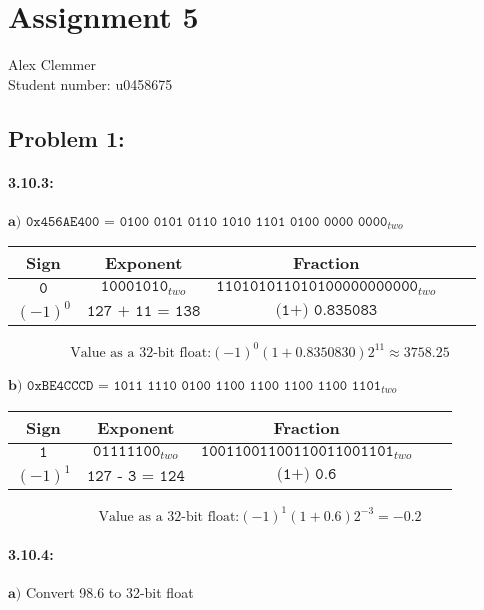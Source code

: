 \documentclass[a4paper]{article}
\begin{document}
\section*{Assignment 5 }
Alex Clemmer\\
Student number: u0458675

\subsection*{Problem 1:}
\paragraph*{3.10.3:} $\textbf{a)}$ $\texttt{0x456AE400 = 0100 0101 0110 1010 1101 0100 0000 0000}_{two}$

\begin{center}
\begin{tabular}{|c|c|c|c|c|}
\hline
Sign & Exponent & Fraction\\
\hline
$\texttt{0}$ & $\texttt{10001010}_{two}$ & $\texttt{110101011010100000000000}_{two}$ \\
\hline
$(-1)^0$ & $\texttt{127 + 11 = 138}$ & $\texttt{(1+) 0.835083}$ \\
\hline
\end{tabular}
\end{center}

\begin{equation}
\mbox{Value as a 32-bit float:} (-1)^0(1+ 0.8350830)2^11 \approx 3758.25
\end{equation}

$\textbf{b)}$ $\texttt{0xBE4CCCD = 1011 1110 0100 1100 1100 1100 1100 1101}_{two}$

\begin{center}
\begin{tabular}{|c|c|c|c|c|}
\hline
Sign & Exponent & Fraction\\
\hline
$\texttt{1}$ & $\texttt{01111100}_{two}$ & $\texttt{10011001100110011001101}_{two}$ \\
\hline
$(-1)^1$ & $\texttt{127 - 3 = 124}$ & $\texttt{(1+) 0.6}$ \\
\hline
\end{tabular}
\end{center}

\begin{equation}
\mbox{Value as a 32-bit float:} (-1)^1(1+ 0.6)2^{-3} = -0.2
\end{equation}

\paragraph*{3.10.4:} $\textbf{a)}$ Convert 98.6 to 32-bit float
\end{document}
